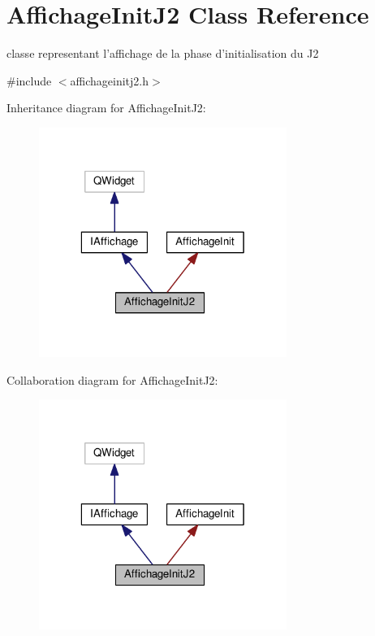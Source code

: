 \hypertarget{classAffichageInitJ2}{\section{Affichage\+Init\+J2 Class Reference}
\label{classAffichageInitJ2}
}


classe representant l'affichage de la phase d'initialisation du J2  




{\ttfamily \#include $<$affichageinitj2.\+h$>$}



Inheritance diagram for Affichage\+Init\+J2\+:
\nopagebreak
\begin{figure}[H]
\begin{center}
\leavevmode
\includegraphics[width=229pt]{classAffichageInitJ2__inherit__graph}
\end{center}
\end{figure}


Collaboration diagram for Affichage\+Init\+J2\+:
\nopagebreak
\begin{figure}[H]
\begin{center}
\leavevmode
\includegraphics[width=229pt]{classAffichageInitJ2__coll__graph}
\end{center}
\end{figure}
